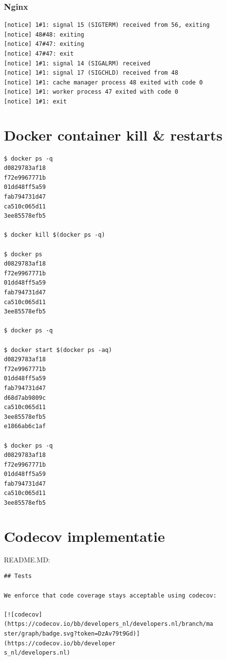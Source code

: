 \subsubsection{Nginx}
\begin{verbatim}
[notice] 1#1: signal 15 (SIGTERM) received from 56, exiting
[notice] 48#48: exiting
[notice] 47#47: exiting
[notice] 47#47: exit
[notice] 1#1: signal 14 (SIGALRM) received
[notice] 1#1: signal 17 (SIGCHLD) received from 48
[notice] 1#1: cache manager process 48 exited with code 0
[notice] 1#1: worker process 47 exited with code 0
[notice] 1#1: exit
\end{verbatim}

\section{Docker container kill \& restarts}

\label{DockerKills}

\begin{verbatim}
$ docker ps -q
d0829783af18
f72e9967771b
01dd48ff5a59
fab794731d47
ca510c065d11
3ee85578efb5

$ docker kill $(docker ps -q) 

$ docker ps
d0829783af18
f72e9967771b
01dd48ff5a59
fab794731d47
ca510c065d11
3ee85578efb5

$ docker ps -q

$ docker start $(docker ps -aq)
d0829783af18
f72e9967771b
01dd48ff5a59
fab794731d47
d68d7ab9809c
ca510c065d11
3ee85578efb5
e1866ab6c1af

$ docker ps -q
d0829783af18
f72e9967771b
01dd48ff5a59
fab794731d47
ca510c065d11
3ee85578efb5
\end{verbatim}

\section{Codecov implementatie} \label{codecov}
README.MD:
\begin{verbatim}
## Tests

We enforce that code coverage stays acceptable using codecov:

[![codecov](https://codecov.io/bb/developers_nl/developers.nl/branch/ma
ster/graph/badge.svg?token=DzAv79t9Gd)](https://codecov.io/bb/developer
s_nl/developers.nl)
\end{verbatim}

